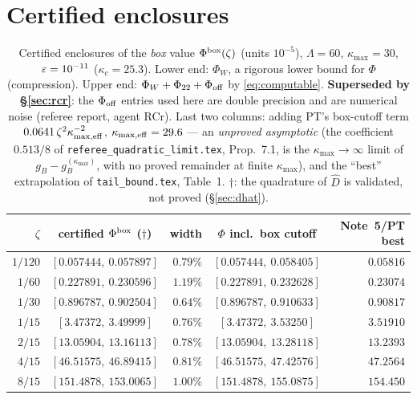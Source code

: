 \documentclass[11pt]{article}
\begin{document}
\section{Certified enclosures}\label{sec:table}

\begin{table}[ht]\centering\small
\caption{Certified enclosures of the \emph{box} value $\Phi^{\rm box}(\zeta)$ (units $10^{-5}$),
$\Lambda=60$, $\kappa_{\max}=30$, $\varepsilon=10^{-11}$ ($\kappa_c=25.3$).  Lower end: $\Phi_W$, a rigorous
lower bound for $\Phi$ (compression).  Upper end: $\Phi_W+\Phi_{22}+\Phi_{\rm off}$ by
\eqref{eq:computable}.  \textbf{Superseded by \S\ref{sec:rcr}}: the $\Phi_{\rm off}$
entries used here are double precision and are numerical noise (referee report, agent RCr).  Last two
columns: adding PT's box-cutoff term $0.0641\,\zeta^2\kappa_{\max,\rm eff}^{-2}$,
$\kappa_{\max,\rm eff}=29.6$ --- an \emph{unproved asymptotic} (the coefficient $0.513/8$ of
\texttt{referee\_quadratic\_limit.tex}, Prop.~7.1, is the $\kappa_{\max}\to\infty$ limit of
$g_B-g_B^{(\kappa_{\max})}$, with no proved remainder at finite $\kappa_{\max}$), and
the ``best'' extrapolation of \texttt{tail\_bound.tex}, Table~1.  $\dagger$: the quadrature of
$\widehat D$ is validated, not proved (\S\ref{sec:dhat}).}\label{tab:cert}
\begin{tabular}{r c r c r}\toprule
$\zeta$ & certified $\Phi^{\rm box}$ ($\dagger$) & width & $\Phi$ incl.\ box cutoff & Note~5/PT best\\\midrule
$1/120$ & $[0.057444,\ 0.057897]$ & $0.79\%$ & $[0.057444,\ 0.058405]$ & $0.05816$\\
$1/60$  & $[0.227891,\ 0.230596]$ & $1.19\%$ & $[0.227891,\ 0.232628]$ & $0.23074$\\
$1/30$  & $[0.896787,\ 0.902504]$ & $0.64\%$ & $[0.896787,\ 0.910633]$ & $0.90817$\\
$1/15$  & $[3.47372,\ 3.49999]$   & $0.76\%$ & $[3.47372,\ 3.53250]$   & $3.51910$\\
$2/15$  & $[13.05904,\ 13.16113]$ & $0.78\%$ & $[13.05904,\ 13.28118]$ & $13.2393$\\
$4/15$  & $[46.51575,\ 46.89415]$ & $0.81\%$ & $[46.51575,\ 47.42576]$ & $47.2564$\\
$8/15$  & $[151.4878,\ 153.0065]$ & $1.00\%$ & $[151.4878,\ 155.0875]$ & $154.450$\\
\bottomrule\end{tabular}\end{table}
\end{document}
